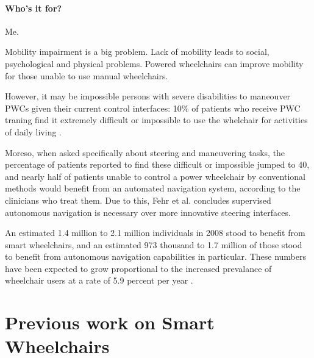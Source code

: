 \paragraph{Who's it for?} Me.

Mobility impairment is a big problem.
Lack of mobility leads to social, psychological and physical problems.
Powered wheelchairs can improve mobility for those unable to use manual wheelchairs.

However, it may be impossible persons with severe disabilities to maneouver PWCs
given their current control interfaces: 10\% of patients who receive PWC traning
find it extremely difficult or impossible to use the whelchair for activities of
daily living \cite{fehr2000adequacy}.

Moreso, when asked specifically about steering and maneuvering tasks, the
percentage of patients reported to find these difficult or impossible jumped to
40, and  nearly half of patients unable to control a power wheelchair by
conventional methods would benefit from an automated navigation system,
according to the clinicians who treat them. 
Due to this, Fehr et al. \cite{fehr2000adequacy} concludes supervised autonomous
navigation is necessary over more innovative steering interfaces.

An estimated 1.4 million to 2.1 million individuals in 2008 stood to benefit
from smart wheelchairs, and an estimated 973 thousand to 1.7 million of those
stood to benefit from autonomous navigation capabilities in particular. These
numbers have been expected to grow proportional to the increased prevalance of
wheelchair users at a rate of 5.9 percent per year \cite{simpson2008many}.



\section{Previous work on Smart Wheelchairs}
